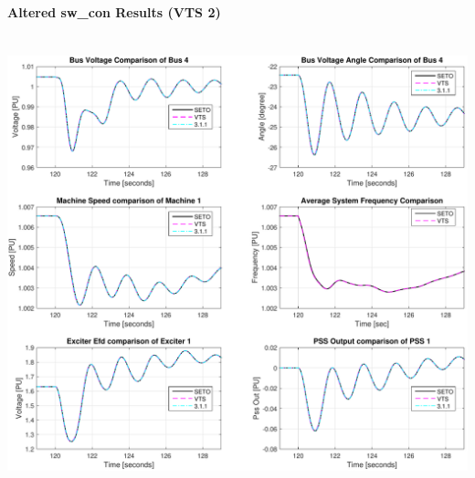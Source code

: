\documentclass[12pt]{article}
\begin{document}
\pagebreak
\paragraph{Altered sw\_con Results (VTS 2)} \ \\

\includegraphics[width=\linewidth]{verCompDetail2ALT}
\end{document}
